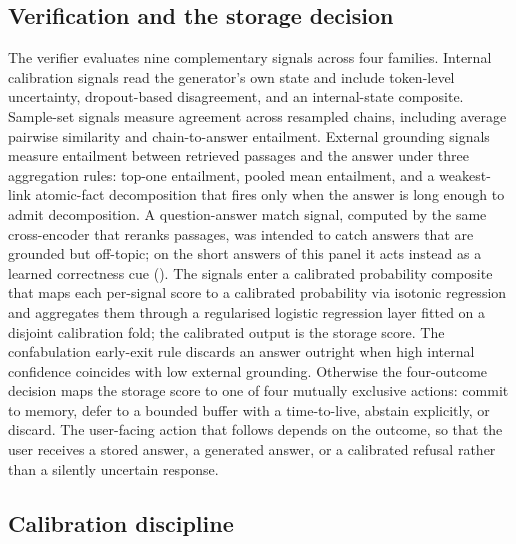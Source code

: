 \subsection{Verification and the storage decision}
\label{sec:per-query-pipeline}

The verifier evaluates nine complementary signals across four families. Internal calibration signals read the generator's own state and include token-level uncertainty, dropout-based disagreement, and an internal-state composite. Sample-set signals measure agreement across resampled chains, including average pairwise similarity and chain-to-answer entailment. External grounding signals measure entailment between retrieved passages and the answer under three aggregation rules: top-one entailment, pooled mean entailment, and a weakest-link atomic-fact decomposition that fires only when the answer is long enough to admit decomposition. A question-answer match signal, computed by the same cross-encoder that reranks passages, was intended to catch answers that are grounded but off-topic; on the short answers of this panel it acts instead as a learned correctness cue (). The signals enter a calibrated probability composite that maps each per-signal score to a calibrated probability via isotonic regression and aggregates them through a regularised logistic regression layer fitted on a disjoint calibration fold; the calibrated output is the storage score. The confabulation early-exit rule discards an answer outright when high internal confidence coincides with low external grounding. Otherwise the four-outcome decision maps the storage score to one of four mutually exclusive actions: commit to memory, defer to a bounded buffer with a time-to-live, abstain explicitly, or discard. The user-facing action that follows depends on the outcome, so that the user receives a stored answer, a generated answer, or a calibrated refusal rather than a silently uncertain response.

\subsection{Calibration discipline}
\label{sec:calibration-discipline}


